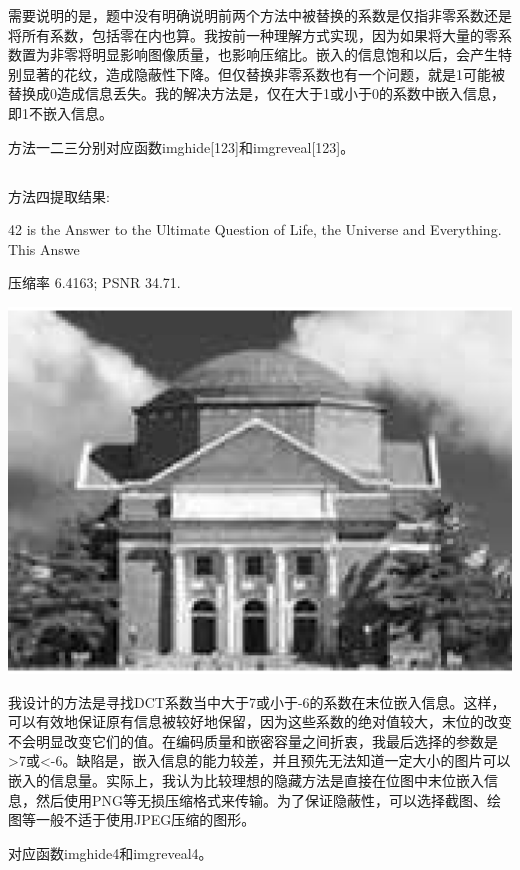 \documentclass{article}
\begin{document}
\par 需要说明的是，题中没有明确说明前两个方法中被替换的系数是仅指非零系数还是将所有系数，包括零在内也算。我按前一种理解方式实现，因为如果将大量的零系数置为非零将明显影响图像质量，也影响压缩比。嵌入的信息饱和以后，会产生特别显著的花纹，造成隐蔽性下降。但仅替换非零系数也有一个问题，就是1可能被替换成0造成信息丢失。我的解决方法是，仅在大于1或小于0的系数中嵌入信息，即1不嵌入信息。
\par 方法一二三分别对应函数imghide[123]和imgreveal[123]。

\subsection{}
\noindent{}
\par 方法四提取结果:
\par 	42 is the Answer to the Ultimate Question of Life, the Universe and Everything. This Answe
\par 压缩率 6.4163; PSNR 34.71.
\begin{center}\includegraphics[width=\textwidth]{hidden4.eps}\end{center}
\par 我设计的方法是寻找DCT系数当中大于7或小于-6的系数在末位嵌入信息。这样，可以有效地保证原有信息被较好地保留，因为这些系数的绝对值较大，末位的改变不会明显改变它们的值。在编码质量和嵌密容量之间折衷，我最后选择的参数是>7或<-6。缺陷是，嵌入信息的能力较差，并且预先无法知道一定大小的图片可以嵌入的信息量。实际上，我认为比较理想的隐藏方法是直接在位图中末位嵌入信息，然后使用PNG等无损压缩格式来传输。为了保证隐蔽性，可以选择截图、绘图等一般不适于使用JPEG压缩的图形。
\par 对应函数imghide4和imgreveal4。
\end{document}
